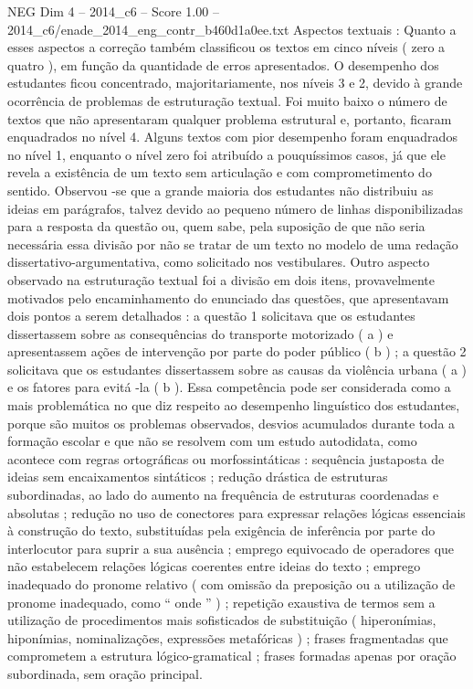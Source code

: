 \begin{textsample}{NEG Dim 4 – 2014\_c6 – Score 1.00 – 2014\_c6/enade\_2014\_eng\_contr\_b460d1a0ee.txt}
Aspectos textuais : Quanto a esses aspectos a correção também classificou os textos em cinco níveis ( zero a quatro ), em função da quantidade de erros apresentados.
O desempenho dos estudantes ficou concentrado, majoritariamente, nos níveis 3 e 2, devido à grande ocorrência de problemas de estruturação textual.
Foi muito baixo o número de textos que não apresentaram qualquer problema estrutural e, portanto, ficaram enquadrados no nível 4.
Alguns textos com pior desempenho foram enquadrados no nível 1, enquanto o nível zero foi atribuído a pouquíssimos casos, já que ele revela a existência de um texto sem articulação e com comprometimento do sentido.
Observou -se que a grande maioria dos estudantes não distribuiu as ideias em parágrafos, talvez devido ao pequeno número de linhas disponibilizadas para a resposta da questão ou, quem sabe, pela suposição de que não seria necessária essa divisão por não se tratar de um texto no modelo de uma redação dissertativo-argumentativa, como solicitado nos vestibulares.
Outro aspecto observado na estruturação textual foi a divisão em dois itens, provavelmente motivados pelo encaminhamento do enunciado das questões, que apresentavam dois pontos a serem detalhados : a questão 1 solicitava que os estudantes dissertassem sobre as consequências do transporte motorizado ( a ) e apresentassem ações de intervenção por parte do poder público ( b ) ; a questão 2 solicitava que os estudantes dissertassem sobre as causas da violência urbana ( a ) e os fatores para evitá -la ( b ).
Essa competência pode ser considerada como a mais problemática no que diz respeito ao desempenho linguístico dos estudantes, porque são muitos os problemas observados, desvios acumulados durante toda a formação escolar e que não se resolvem com um estudo autodidata, como acontece com regras ortográficas ou morfossintáticas : sequência justaposta de ideias sem encaixamentos sintáticos ; redução drástica de estruturas subordinadas, ao lado do aumento na frequência de estruturas coordenadas e absolutas ; redução no uso de conectores para expressar relações lógicas essenciais à construção do texto, substituídas pela exigência de inferência por parte do interlocutor para suprir a sua ausência ; emprego equivocado de operadores que não estabelecem relações lógicas coerentes entre ideias do texto ; emprego inadequado do pronome relativo ( com omissão da preposição ou a utilização de pronome inadequado, como “ onde ” ) ; repetição exaustiva de termos sem a utilização de procedimentos mais sofisticados de substituição ( hiperonímias, hiponímias, nominalizações, expressões metafóricas ) ; frases fragmentadas que comprometem a estrutura lógico-gramatical ; frases formadas apenas por oração subordinada, sem oração principal.

\end{textsample}
